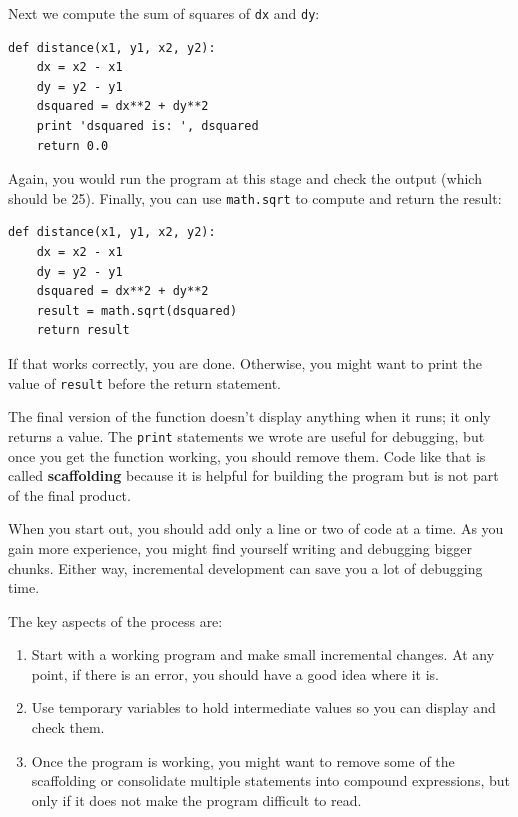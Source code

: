 \documentclass[10pt]{book}
\begin{document}
Next we compute the sum of squares of {\tt dx} and {\tt dy}:

\beforeverb
\begin{verbatim}
def distance(x1, y1, x2, y2):
    dx = x2 - x1
    dy = y2 - y1
    dsquared = dx**2 + dy**2
    print 'dsquared is: ', dsquared
    return 0.0
\end{verbatim}
\afterverb
%
Again, you would run the program at this stage and check the output
(which should be 25).
Finally, you can use {\tt math.sqrt} to compute and return the result:


\beforeverb
\begin{verbatim}
def distance(x1, y1, x2, y2):
    dx = x2 - x1
    dy = y2 - y1
    dsquared = dx**2 + dy**2
    result = math.sqrt(dsquared)
    return result
\end{verbatim}
\afterverb
%
If that works correctly, you are done.  Otherwise, you might
want to print the value of {\tt result} before the return
statement.

The final version of the function doesn't display anything when it
runs; it only returns a value.  The {\tt print} statements we wrote
are useful for debugging, but once you get the function working, you
should remove them.  Code like that is called {\bf scaffolding}
because it is helpful for building the program but is not part of the
final product.


When you start out, you should add only a line or two of code at a
time.  As you gain more experience, you might find yourself writing
and debugging bigger chunks.  Either way, incremental development
can save you a lot of debugging time.

The key aspects of the process are:

\begin{enumerate}

\item Start with a working program and make small incremental changes. 
At any point, if there is an error, you should have a good idea
where it is.

\item Use temporary variables to hold intermediate values so you can
display and check them.

\item Once the program is working, you might want to remove some of
the scaffolding or consolidate multiple statements into compound
expressions, but only if it does not make the program difficult to
read.

\end{enumerate}
\end{document}
